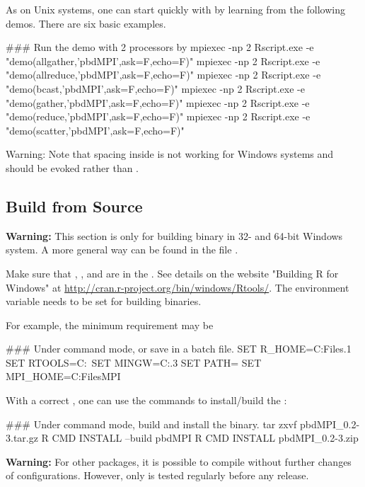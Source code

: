 As on Unix systems,
one can start quickly with  by learning from the
following demos. There are six basic examples.
\begin{Command}
### Run the demo with 2 processors by
mpiexec -np 2 Rscript.exe -e "demo(allgather,'pbdMPI',ask=F,echo=F)"
mpiexec -np 2 Rscript.exe -e "demo(allreduce,'pbdMPI',ask=F,echo=F)"
mpiexec -np 2 Rscript.exe -e "demo(bcast,'pbdMPI',ask=F,echo=F)"
mpiexec -np 2 Rscript.exe -e "demo(gather,'pbdMPI',ask=F,echo=F)"
mpiexec -np 2 Rscript.exe -e "demo(reduce,'pbdMPI',ask=F,echo=F)"
mpiexec -np 2 Rscript.exe -e "demo(scatter,'pbdMPI',ask=F,echo=F)"
\end{Command}
{\color{red}Warning:}
Note that spacing inside  is not working for Windows systems
and  should be evoked rather than .


\subsection[Build from Source]{Build from Source}
\label{sec:building_from_source}

{\color{red} \bf Warning:} This section is only for building binary in
32- and 64-bit Windows system. A more general way can be found in the file
.

Make sure that , , and  are in
the .
See details on the website "Building R for Windows" at
\url{http://cran.r-project.org/bin/windows/Rtools/}.
The environment variable 
needs to be set for building binaries.

For example, the minimum requirement may be
\begin{Command}
### Under command mode, or save in a batch file.
SET R_HOME=C:\Program Files\R{}.1
SET RTOOLS=C:\Rtools\bin\
SET MINGW=C:\Rtools{}.3\bin
SET PATH=%
SET MPI_HOME=C:\Program Files\Miscrosoft MPI
\end{Command}

With a correct , one can use the  commands
to install/build the \pkg{pbdMPI}:
\begin{Command}
### Under command mode, build and install the binary.
tar zxvf pbdMPI_0.2-3.tar.gz
R CMD INSTALL --build pbdMPI
R CMD INSTALL pbdMPI_0.2-3.zip
\end{Command}

{\color{red} \bf Warning:} For other  packages, it is possible
to compile without further changes of configurations. However, only
\pkg{pbdMPI} is tested regularly before any release.

